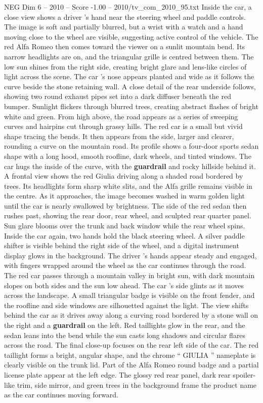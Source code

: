 \begin{textsample}{NEG Dim 6 – 2010 – Score -1.00 – 2010/tv\_com\_2010\_95.txt}
Inside the car, a close view shows a driver ’s hand near the steering wheel and paddle controls.
The image is soft and partially blurred, but a wrist with a watch and a hand moving close to the wheel are visible, suggesting active control of the vehicle.
The red Alfa Romeo then comes toward the viewer on a sunlit mountain bend.
Its narrow headlights are on, and the triangular grille is centred between them.
The low sun shines from the right side, creating bright glare and lens-like circles of light across the scene.
The car ’s nose appears planted and wide as it follows the curve beside the stone retaining wall.
A close detail of the rear underside follows, showing two round exhaust pipes set into a dark diffuser beneath the red bumper.
Sunlight flickers through blurred trees, creating abstract flashes of bright white and green.
From high above, the road appears as a series of sweeping curves and hairpins cut through grassy hills.
The red car is a small but vivid shape tracing the bends.
It then appears from the side, larger and clearer, rounding a curve on the mountain road.
Its profile shows a four-door sports sedan shape with a long hood, smooth roofline, dark wheels, and tinted windows.
The car hugs the inside of the curve, with the \textbf{guardrail} and rocky hillside behind it.
A frontal view shows the red Giulia driving along a shaded road bordered by trees.
Its headlights form sharp white slits, and the Alfa grille remains visible in the centre.
As it approaches, the image becomes washed in warm golden light until the car is nearly swallowed by brightness.
The side of the red sedan then rushes past, showing the rear door, rear wheel, and sculpted rear quarter panel.
Sun glare blooms over the trunk and back window while the rear wheel spins.
Inside the car again, two hands hold the black steering wheel.
A silver paddle shifter is visible behind the right side of the wheel, and a digital instrument display glows in the background.
The driver ’s hands appear steady and engaged, with fingers wrapped around the wheel as the car continues through the road.
The red car passes through a mountain valley in bright sun, with dark mountain slopes on both sides and the sun low ahead.
The car ’s side glints as it moves across the landscape.
A small triangular badge is visible on the front fender, and the roofline and side windows are silhouetted against the light.
The view shifts behind the car as it drives away along a curving road bordered by a stone wall on the right and a \textbf{guardrail} on the left.
Red taillights glow in the rear, and the sedan leans into the bend while the sun casts long shadows and circular flares across the road.
The final close-up focuses on the rear left side of the car.
The red taillight forms a bright, angular shape, and the chrome “ GIULIA ” nameplate is clearly visible on the trunk lid.
Part of the Alfa Romeo round badge and a partial license plate appear at the left edge.
The glossy red rear panel, dark rear spoiler-like trim, side mirror, and green trees in the background frame the product name as the car continues moving forward.

\end{textsample}
